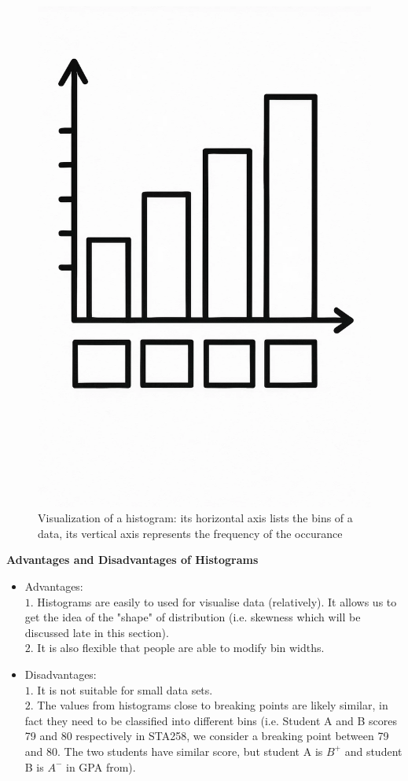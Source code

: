 \begin{figure}[H]
 \centering
 \includegraphics[scale=0.15]{Section1/img/Histogram.jpg}
 \caption{Visualization of a histogram: its horizontal axis lists the bins of a data, its vertical axis represents the frequency of the occurance}
\end{figure}

\noindent
\textbf{Advantages and Disadvantages of Histograms}

\begin{itemize}
 \item Advantages:\\
 $1.$ Histograms are easily to used for visualise data (relatively). It allows us to get the idea of the "shape" of distribution (i.e. skewness which will be discussed late in this section).\\
 $2.$ It is also flexible that people are able to modify bin widths.
 \item Disadvantages:\\
 $1.$ It is not suitable for small data sets.\\
 $2.$ The values from histograms close to breaking points are likely similar, in fact they need to be classified into different bins (i.e. Student A and B scores 79 and 80 respectively in STA258, we consider a breaking point between 79 and 80. The two students have similar score, but student A is $B^+$ and student B is $A^-$ in GPA from).
\end{itemize}

